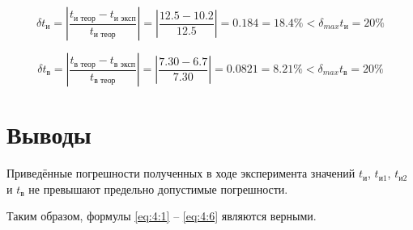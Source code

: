 \begin{displaymath}
	\delta t_{\text{и}} = \left| \frac{t_{\text{и теор}} - t_{\text{и эксп}}}{t_{\text{и теор}}} \right| = \left| \frac{12.5 - 10.2}{12.5} \right| = 0.184 = 18.4 \% < \delta_{max} t_{\text{и}} = 20 \%
\end{displaymath}

\begin{displaymath}
	\delta t_{\text{в}} = \left| \frac{t_{\text{в теор}} - t_{\text{в эксп}}}{t_{\text{в теор}}} \right| = \left| \frac{7.30 - 6.7}{7.30} \right| = 0.0821 = 8.21 \% < \delta_{max} t_{\text{в}} = 20 \%
\end{displaymath}

\section{Выводы}

Приведённые погрешности полученных в ходе эксперимента значений $t_{\text{и}}$, $t_{\text{и1}}$, $t_{\text{и2}}$ и $t_{\text{в}}$ не превышают предельно допустимые погрешности.

Таким образом, формулы \ref{eq:4:1} -- \ref{eq:4:6} являются верными.

